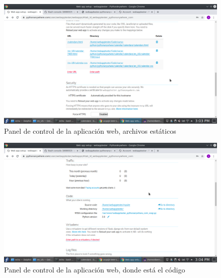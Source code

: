 \documentclass[10pt,a4paper]{article}
\begin{document}
\begin{figure}
	\centering
	\includegraphics[width=0.7\linewidth]{sc/webapp_static_0}
	\caption{Panel de control de la aplicación web, archivos estáticos}
	\label{fig:webappstatic0}
\end{figure}

\begin{figure}
	\centering
	\includegraphics[width=0.7\linewidth]{sc/webapp_code}
	\caption{Panel de control de la aplicación web, donde está el código}
	\label{fig:webappcode}
\end{figure}
\end{document}
